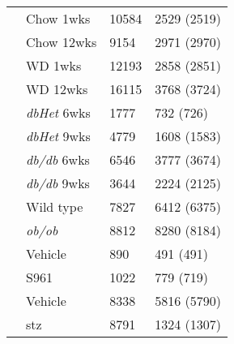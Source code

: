 \begin{table}[h]
\begin{tabularx}{\textwidth}{W{2.5cm}  W{2.5cm}  C{4cm}  C{4cm}}
     & Chow 1wks & 10584  & 2529 (2519)  \\
    & Chow 12wks & 9154 & 2971 (2970) \\
    & WD 1wks & 12193 & 2858 (2851) \\
    & WD 12wks & 16115 & 3768 (3724) \\
    \midrule
     & \textit{dbHet} 6wks & 1777  & 732 (726)  \\
    & \textit{dbHet} 9wks & 4779 & 1608 (1583) \\
    & \textit{db/db} 6wks & 6546 & 3777 (3674) \\
    & \textit{db/db} 9wks & 3644 & 2224 (2125) \\
    \midrule
     & Wild type & 7827  & 6412 (6375)  \\
    & \textit{ob/ob} & 8812 & 8280 (8184) \\
    \midrule
     & Vehicle & 890  & 491 (491)  \\
    & S961 & 1022 & 779 (719) \\
    \midrule
     & Vehicle & 8338  & 5816 (5790)  \\
    & \gls{stz} & 8791 & 1324 (1307) \\
    \bottomrule
   \end{tabularx}
   \vspace{0.1cm}
\end{table}



